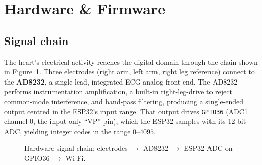 \section{Hardware \& Firmware}

\subsection{Signal chain}
The heart's electrical activity reaches the digital domain through the chain shown
in Figure~\ref{fig:wiring}. Three electrodes (right arm, left arm, right leg
reference) connect to the \textbf{AD8232}, a single-lead, integrated ECG analog
front-end. The AD8232 performs instrumentation amplification, a built-in
right-leg-drive to reject common-mode interference, and band-pass filtering,
producing a single-ended output centred in the ESP32's input range. That output
drives \texttt{GPIO36} (ADC1 channel 0, the input-only ``VP'' pin), which the
ESP32 samples with its 12-bit ADC, yielding integer codes in the range
$0$--$4095$.

\begin{figure}[h]
  \centering
  \caption{Hardware signal chain: electrodes $\rightarrow$ AD8232 $\rightarrow$
  ESP32 ADC on GPIO36 $\rightarrow$ Wi-Fi.}
  \label{fig:wiring}
\end{figure}

